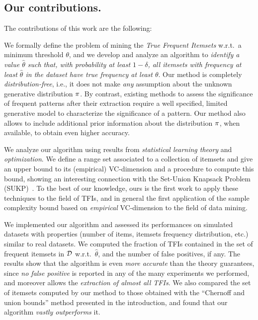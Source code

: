 \subsection{Our contributions.}
The contributions of this work are the following:
\begin{itemize*}
	\item We formally define the problem of mining the \emph{True Frequent
	Itemsets} w.r.t.~a minimum threshold $\theta$, and we develop and analyze an
	algorithm to \emph{identify a value $\hat{\theta}$ such that, with
	probability at least $1-\delta$, all itemsets with frequency at least
	$\hat{\theta}$ in the dataset have true frequency at least $\theta$}. Our
	method is completely \emph{distribution-free}, i.e., it does not make
	\emph{any} assumption about the unknown generative distribution $\pi$. By
	contrast, existing methods to assess the significance of frequent patterns
	after their extraction require a well specified, limited generative model to
	characterize the significance of a pattern. Our method also allows to
	include additional prior information about the distribution $\pi$, when
	available, to obtain even higher accuracy.
	\item We analyze our algorithm using results from \emph{statistical learning
	theory} and \emph{optimization}. We define a range set associated to a
	collection of itemsets and give an upper bound to its (empirical)
	VC-dimension and a procedure to compute this bound, showing an interesting
	connection with the Set-Union Knapsack Problem
	(SUKP)~\citep{GoldschmidtNY94}. To the best of our knowledge, ours is the
	first work to apply these techniques to the field of TFIs, and in general
	the first application of the sample complexity bound based on
	\emph{empirical} VC-dimension to the field of data mining.
	\item We implemented our algorithm and assessed its performances on
	simulated datasets with properties (number of items, itemsets frequency
	distribution, etc.) similar to real datasets. We computed the fraction of
	TFIs contained in the set of frequent itemsets in ${\cal D}$ w.r.t.~$\hat\theta$,
	and the number of false positives, if any. The results show that the
	algorithm is even \emph{more accurate} than the theory guarantees, since
	\emph{no false positive} is reported in any of the many experiments we
	performed, and moreover allows the \emph{extraction of almost all TFIs}. We
	also compared the set of itemsets computed by our method to those obtained
	with the ``Chernoff and union bounds'' method presented in the introduction,
	and found that our algorithm \emph{vastly outperforms} it.
\end{itemize*}


